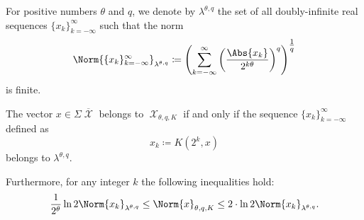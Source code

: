 \begin{definition}\label{def:discrete_k_interpolation_space}
  For positive numbers \( \theta \) and \( q \), we denote by \( \lambda^{\theta,q} \) the set of all doubly-infinite real sequences \( \{ x_k \}_{k=-\infty}^\infty \) such that the norm
  \begin{equation}\label{eq:def:discrete_k_interpolation_space}
    \Norm{\{ x_k \}_{k=-\infty}^\infty}_{\lambda^{\theta,q}} \coloneqq \left( \sum_{k=-\infty}^\infty \left( \frac {\Abs{x_k}} {2^{k\theta}} \right)^q \right)^{\tfrac 1 q}
  \end{equation}
  is finite.
\end{definition}

\begin{theorem}\label{thm:discrete_k_interpolation}
  The vector \( x \in \Sigma\overline{\mscrX} \) belongs to \hyperref[def:k_functional_interpolation_space]{\( \mscrX_{\theta,q,K} \)} if and only if the sequence \( \{ x_k \}_{k=-\infty}^\infty \) defined as
  \begin{equation}\label{eq:thm:discrete_k_interpolation/sequence}
    x_k \coloneqq K(2^k, x)
  \end{equation}
  belongs to \hyperref[def:discrete_k_interpolation_space]{\( \lambda^{\theta,q} \)}.

  Furthermore, for any integer \( k \) the following inequalities hold:
  \begin{equation}\label{eq:thm:discrete_k_interpolation/inequalities}
    \frac 1 {2^\theta} \ln 2 \Norm{x_k}_{\lambda^{\theta,q}}
    \leq
    \Norm{x}_{\theta,q,K}
    \leq
    2 \cdot \ln 2 \Norm{x_k}_{\lambda^{\theta,q}}.
  \end{equation}
\end{theorem}
